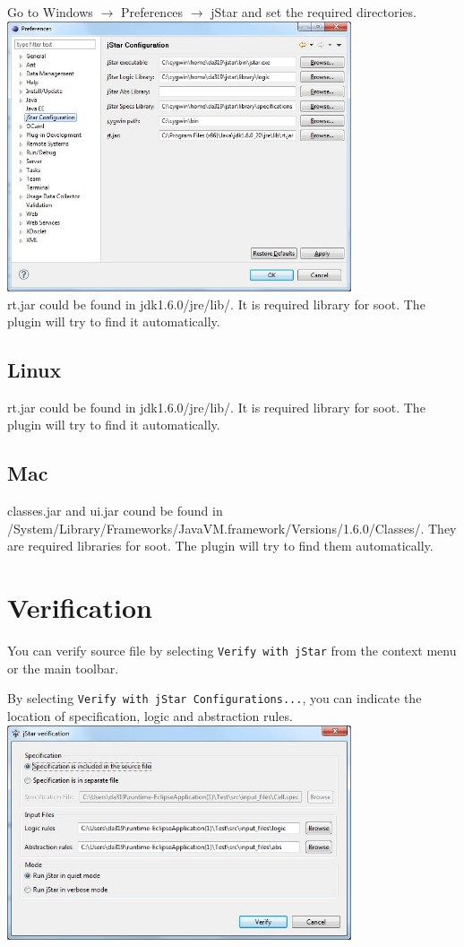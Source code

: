 \documentclass{article}
\begin{document}
Go to Windows $\rightarrow$ Preferences $\rightarrow$ jStar and set the required directories.\\

\includegraphics[width=4in]{images/preferences.jpg}\\

rt.jar could be found in jdk1.6.0/jre/lib/. It is required library for soot. The plugin will try to find it automatically. 

\subsection{Linux}
rt.jar could be found in jdk1.6.0/jre/lib/. It is required library for soot. The plugin will try to find it automatically. 

\subsection{Mac}
classes.jar and ui.jar cound be found in \\ /System/Library/Frameworks/JavaVM.framework/Versions/1.6.0/Classes/.  They are required libraries for soot. The plugin will try to find them automatically. 

\section{Verification}
You can verify source file by selecting \texttt{Verify with jStar} from the context menu or the main toolbar. 

By selecting \texttt{Verify with jStar Configurations...}, you can indicate the location of specification, logic and abstraction rules.\\

\includegraphics[width=4in]{images/verificationWindow.jpg}
\end{document}
